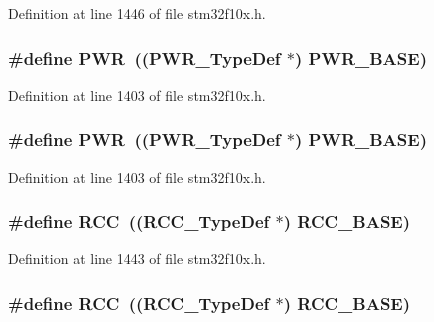 Definition at line 1446 of file stm32f10x.\+h.

\subsubsection[{\texorpdfstring{P\+WR}{PWR}}]{\setlength{\rightskip}{0pt plus 5cm}\#define P\+WR~(({\bf P\+W\+R\+\_\+\+Type\+Def} $\ast$) {\bf P\+W\+R\+\_\+\+B\+A\+SE})}\hypertarget{group___peripheral__declaration_ga04651c526497822a859942b928e57f8e}{}\label{group___peripheral__declaration_ga04651c526497822a859942b928e57f8e}


Definition at line 1403 of file stm32f10x.\+h.

\subsubsection[{\texorpdfstring{P\+WR}{PWR}}]{\setlength{\rightskip}{0pt plus 5cm}\#define P\+WR~(({\bf P\+W\+R\+\_\+\+Type\+Def} $\ast$) {\bf P\+W\+R\+\_\+\+B\+A\+SE})}\hypertarget{group___peripheral__declaration_ga04651c526497822a859942b928e57f8e}{}\label{group___peripheral__declaration_ga04651c526497822a859942b928e57f8e}


Definition at line 1403 of file stm32f10x.\+h.

\subsubsection[{\texorpdfstring{R\+CC}{RCC}}]{\setlength{\rightskip}{0pt plus 5cm}\#define R\+CC~(({\bf R\+C\+C\+\_\+\+Type\+Def} $\ast$) {\bf R\+C\+C\+\_\+\+B\+A\+SE})}\hypertarget{group___peripheral__declaration_ga74944438a086975793d26ae48d5882d4}{}\label{group___peripheral__declaration_ga74944438a086975793d26ae48d5882d4}


Definition at line 1443 of file stm32f10x.\+h.

\subsubsection[{\texorpdfstring{R\+CC}{RCC}}]{\setlength{\rightskip}{0pt plus 5cm}\#define R\+CC~(({\bf R\+C\+C\+\_\+\+Type\+Def} $\ast$) {\bf R\+C\+C\+\_\+\+B\+A\+SE})}\hypertarget{group___peripheral__declaration_ga74944438a086975793d26ae48d5882d4}{}\label{group___peripheral__declaration_ga74944438a086975793d26ae48d5882d4}



